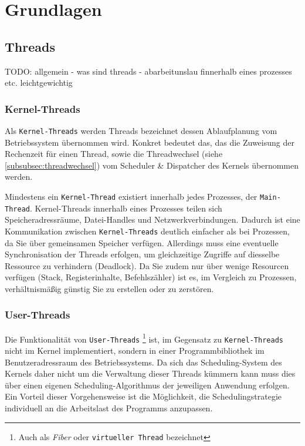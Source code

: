 \section{Grundlagen}
\label{sec:grundlagen}

\subsection{Threads}
\label{subsec:threads}
TODO: allgemein -  was sind threads - abarbeitunslau finnerhalb eines prozesses etc. leichtgewichtig

\subsubsection{Kernel-Threads}
\label{subsubsec:kernel-threads}
Als \verb|Kernel-Threads| werden Threads bezeichnet dessen Ablaufplanung vom Betriebssystem übernommen wird.
Konkret bedeutet das, das die Zuweisung der Rechenzeit für einen Thread, sowie die Threadwechsel (siehe \ref{subsubsec:threadwechsel})
vom Scheduler \& Dispatcher des Kernels übernommen werden.

Mindestens ein \verb|Kernel-Thread| existiert innerhalb jedes Prozesses, der \verb|Main-Thread|. Kernel-Threads innerhalb eines Prozesses
teilen sich Speicheradressräume, Datei-Handles und Netzwerkverbindungen. Dadurch ist eine Kommunikation zwischen \verb|Kernel-Threads| deutlich
einfacher als bei Prozessen, da Sie über gemeinsamen Speicher verfügen. Allerdings muss eine eventuelle Synchronisation der Threads erfolgen, um
gleichzeitige Zugriffe auf diesselbe Ressource zu verhindern (Deadlock).
Da Sie zudem nur über wenige Resourcen verfügen (Stack, Registerinhalte, Befehlszähler) ist es, im Vergleich zu Prozessen,
verhältnismäßig günstig Sie zu erstellen oder zu zerstören. \parencite[Kapitel 2.2.5 - Implementing Threads in the Kernel]{Tanenbaum2016}\parencite{Brosenne2021}

\subsubsection{User-Threads}
\label{subsubsec:user-threads}
Die Funktionalität von \verb|User-Threads| \footnote{Auch als \textit{Fiber} oder \verb|virtueller Thread| bezeichnet} ist, im Gegensatz zu \verb|Kernel-Threads|
nicht im Kernel implementiert, sondern in einer Programmbibliothek im Benutzeradressraum des Betriebssystems.
Da sich das Scheduling-System des Kernels daher nicht um die Verwaltung dieser Threads kümmern kann muss dies über einen eigenen Scheduling-Algorithmus
der jeweiligen Anwendung erfolgen.
Ein Vorteil dieser Vorgehensweise ist die Möglichkeit, die Schedulingstrategie individuell an die Arbeitslast des Programms anzupassen.

